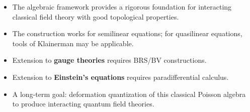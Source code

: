 \documentclass[11pt,a4paper]{article}
\begin{document}
\begin{itemize}[nosep]
  \item The algebraic framework provides a rigorous foundation for
        interacting classical field theory with good topological properties.
  \item The construction works for semilinear equations; for quasilinear
        equations, tools of Klainerman may be applicable.
  \item Extension to \textbf{gauge theories} requires BRS/BV constructions.
  \item Extension to \textbf{Einstein's equations} requires paradifferential
        calculus.
  \item A long-term goal: deformation quantization of this classical
        Poisson algebra to produce interacting quantum field theories.
\end{itemize}
\end{document}
